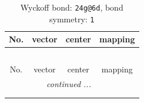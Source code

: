 \documentclass[fleqn,8pt]{jsarticle}
\begin{document}
\renewcommand{\arraystretch}{1.2}
\begin{longtable}{cccc}
\caption{Wyckoff bond: {\tt 24g@6d}, bond symmetry: {\tt 1}}
 \\
 \hline \hline
No. & vector & center & mapping \\ \hline \endfirsthead

\multicolumn{3}{l}{\tablename\ \thetable{}} \\
 \hline \hline
No. & vector & center & mapping \\ \hline \endhead

 \hline \hline
\multicolumn{3}{r}{\footnotesize\it continued ...} \\ \endfoot

 \hline \hline
\multicolumn{3}{r}{} \\ \endlastfoot


\end{longtable}
\end{document}
